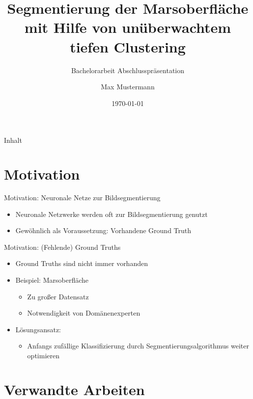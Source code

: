 \documentclass{beamer}
\title{Segmentierung der Marsoberfläche mit Hilfe von unüberwachtem tiefen Clustering}
\subtitle{Bachelorarbeit Abschlusspräsentation}
\author{Max Mustermann}
\date{\today}
\institute[TU Dortmund]{Mustererkennung,\\ Informatik XII, Technische Universität Dortmund}
\begin{document}
\maketitle

\begin{frame}{Inhalt}
\tableofcontents
\end{frame}


\section{Motivation}
\begin{frame}{Motivation: Neuronale Netze zur Bildsegmentierung}
\begin{itemize}
	\item Neuronale Netzwerke werden oft zur Bildsegmentierung genutzt
	\item Gewöhnlich als Voraussetzung: Vorhandene Ground Truth
\end{itemize}%
\end{frame}

\begin{frame}{Motivation: (Fehlende) Ground Truths}
\begin{itemize}
	\item Ground Truths sind nicht immer vorhanden
	\item Beispiel: Marsoberfläche
	\begin{itemize}
		\item Zu großer Datensatz
		\item Notwendigkeit von Domänenexperten
	\end{itemize}
	\item Lösungsansatz:
	\begin{itemize}
		\item Anfangs zufällige Klassifizierung durch Segmentierungsalgorithmus weiter optimieren
	\end{itemize}
\end{itemize}
\end{frame}


\section{Verwandte Arbeiten}
\end{document}

